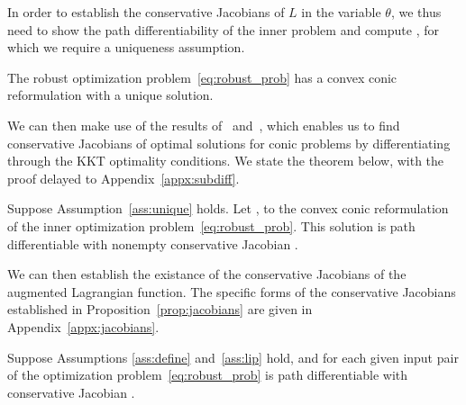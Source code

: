 In order to establish the conservative Jacobians of $L$ in the variable $\theta$, we thus need to show the path differentiability of the inner problem and compute , for which we require a uniqueness assumption.
\begin{assumption} [Uniqueness]
    \label{ass:unique}
    The robust optimization problem~\eqref{eq:robust_prob} has a convex conic reformulation with a unique solution. 
\end{assumption} We can then make use of the results of~\cite{diffcp2019} and~\cite{path-diff}, which enables us to find conservative Jacobians of optimal solutions for conic problems by differentiating through the KKT optimality conditions. 
We state the theorem below, with the proof delayed to Appendix~\ref{appx:subdiff}.
\begin{theorem} 
\label{thm:subdiff}
	Suppose Assumption~\ref{ass:unique} holds. Let , to the convex conic reformulation of the inner optimization problem~\eqref{eq:robust_prob}.
 This solution is path differentiable with nonempty conservative Jacobian  .
\end{theorem}

We can then establish the existance of the conservative Jacobians of the augmented Lagrangian function. The specific forms of the conservative Jacobians established in Proposition~\ref{prop:jacobians} are given in Appendix~\ref{appx:jacobians}.
\begin{proposition}  
\label{prop:jacobians}
Suppose Assumptions \ref{ass:define} and~\ref{ass:lip} hold, and for each given input pair  of the optimization problem~\eqref{eq:robust_prob} is path differentiable with conservative Jacobian . 
\end{proposition}



